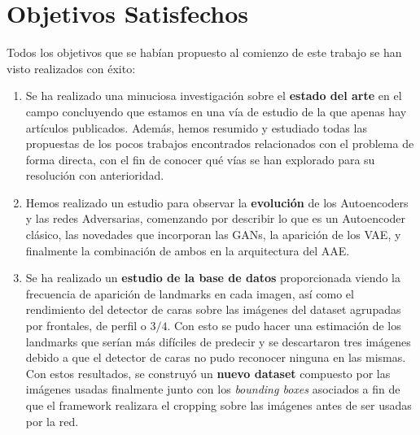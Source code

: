 \section{Objetivos Satisfechos}

Todos los objetivos que se habían propuesto al comienzo de este trabajo se han visto realizados con éxito:

\begin{enumerate}
    \item Se ha realizado una minuciosa investigación sobre el \textbf{estado del arte} en el campo concluyendo que estamos en una vía de estudio de la que apenas hay artículos publicados. Además, hemos resumido y estudiado todas las propuestas de los pocos trabajos encontrados relacionados con el problema de forma directa, con el fin de conocer qué vías se han explorado para su resolución con anterioridad.
    \item Hemos realizado un estudio para observar la \textbf{evolución} de los Autoencoders y las redes Adversarias, comenzando por describir lo que es un Autoencoder clásico, las novedades que incorporan las GANs, la aparición de los VAE, y finalmente la combinación de ambos en la arquitectura del AAE.
    \item Se ha realizado un \textbf{estudio de la base de datos} proporcionada viendo la frecuencia de aparición de landmarks en cada imagen, así como el rendimiento del detector de caras sobre las imágenes del dataset agrupadas por frontales, de perfil o $3/4$. Con esto se pudo hacer una estimación de los landmarks que serían más difíciles de predecir y se descartaron tres imágenes debido a que el detector de caras no pudo reconocer ninguna en las mismas. Con estos resultados, se construyó un \textbf{nuevo dataset} compuesto por las imágenes usadas finalmente junto con los \textit{bounding boxes} asociados a fin de que el framework realizara el cropping sobre las imágenes antes de ser usadas por la red.

\end{enumerate}

